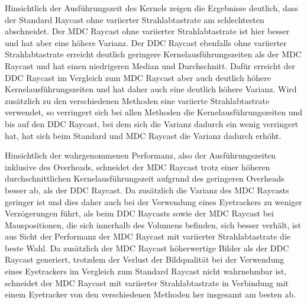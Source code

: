Hinsichtlich der Ausführungszeit des Kernels zeigen die Ergebnisse deutlich, dass der Standard Raycast ohne variierter Strahlabtastrate am schlechtesten abschneidet.
Der MDC Raycast ohne variierter Strahlabtastrate ist hier besser und hat aber eine höhere Varianz.
Der DDC Raycast ebenfalls ohne variierter Strahlabtastrate erreicht deutlich geringere Kernelausführungszeiten als der MDC Raycast und hat einen niedrigeren Median und Durchschnitt.
Dafür erreicht der DDC Raycast im Vergleich zum MDC Raycast aber auch deutlich höhere Kernelausführungszeiten und hat daher auch eine deutlich höhere Varianz.
Wird zusätzlich zu den verschiedenen Methoden eine variierte Strahlabtastrate verwendet, so verringert sich bei allen Methoden die Kernelausführungszeiten und bis auf den DDC Raycast, bei dem sich die Varianz dadurch ein wenig verringert hat, hat sich beim Standard und MDC Raycast die Varianz dadurch erhöht.

Hinsichtlich der wahrgenommenen Performanz, also der Ausführungszeiten inklusive des Overheads, schneidet der MDC Raycast trotz einer höheren durchschnittlichen Kernelausführungszeit aufgrund des geringeren Overheads besser ab, als der DDC Raycast.
Da zusätzlich die Varianz des MDC Raycasts geringer ist und dies daher auch bei der Verwendung eines Eyetrackers zu weniger Verzögerungen führt, als beim DDC Raycasts sowie der MDC Raycast bei Mauspositionen, die sich innerhalb des Volumens befinden, sich besser verhält, ist aus Sicht der Performanz der MDC Raycast mit variierter Strahlabtastrate die beste Wahl.
Da zusätzlich der MDC Raycast höherwertige Bilder als der DDC Raycast generiert, trotzdem der Verlust der Bildqualität bei der Verwendung eines Eyetrackers im Vergleich zum Standard Raycast nicht wahrnehmbar ist, schneidet der MDC Raycast mit variierter Strahlabtastrate in Verbindung mit einem Eyetracker von den verschiedenen Methoden her insgesamt am besten ab.

